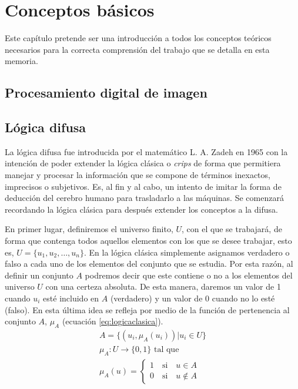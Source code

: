 \chapter{Conceptos básicos}\label{preliminares}\label{basicos}

Este capítulo pretende ser una introducción a todos los conceptos teóricos necesarios para la correcta comprensión del trabajo que se detalla en esta memoria. 


\section{Procesamiento digital de imagen}\label{sec:procesamiento}



\section{Lógica difusa}\label{sec:logicadifusa}
La lógica difusa fue introducida por el matemático L. A. Zadeh \cite{art:zadeh} en 1965 con la intención de poder extender la lógica clásica o {\em crips} de forma que permitiera manejar y procesar la información que se compone de términos inexactos, imprecisos o subjetivos. Es, al fin y al cabo, un intento de imitar la forma de deducción del cerebro humano para trasladarlo a las máquinas. Se comenzará recordando la lógica clásica para después extender los conceptos a la difusa.

En primer lugar, definiremos el universo finito, $U$,  con el que se  trabajará, de forma que contenga todos aquellos elementos con los que se desee trabajar, esto es, $U = \{u_{1}, u_{2}, \dots, u_{n}\}$. En la lógica clásica simplemente asignamos verdadero o falso a cada uno de los elementos del conjunto que se estudia. Por esta razón, al definir un conjunto $A$ podremos decir que este contiene o no a los elementos del universo $U$ con una certeza absoluta. De esta manera, daremos un valor de 1 cuando $u_{i}$ esté incluido en $A$ (verdadero) y un valor de 0 cuando no lo esté (falso). En esta última idea se refleja por medio de la función de pertenencia al conjunto  $A$, $\mu_{A}$ (ecuación \ref{eq:logicaclasica}).
\begin{equation}\label{eq:logicaclasica}
\begin{aligned} 
	A = \{(u_{i}, \mu_{A}(u_{i})) | u_{i}\in U\}\\
	\mu_{A}:U\rightarrow \{0,1\} \text{ tal que}\\
	\mu_{A}(u) = \left\{ \begin{aligned}
		1 \quad\text{si}\quad u\in A\\
		0 \quad\text{si}\quad u\notin A
 	\end{aligned}\right.
\end{aligned}
\end{equation}

